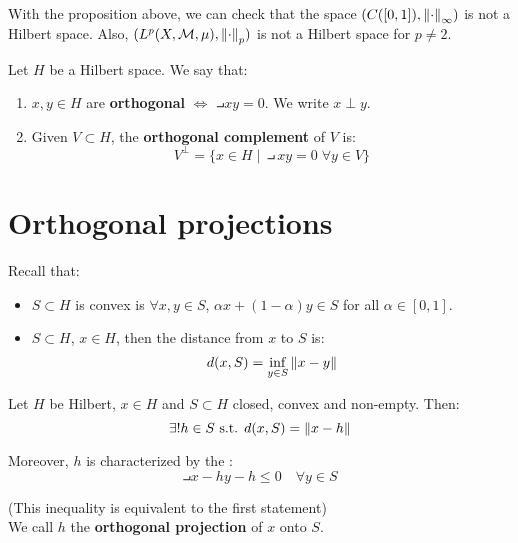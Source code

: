 \begin{fremark}
    With the proposition above, we can check that the space $(C([0, 1]), \left\|\cdot\right\|_\infty)$
    is not a Hilbert space. Also, $(L^p(X, \mathcal{M}, \mu), \left\|\cdot\right\|_p)$ is not a Hilbert space for $p \neq 2$.
\end{fremark}

\begin{fdefinition}
    Let $H$ be a Hilbert space. We say that:
    \vspace{1em}
    \begin{enumerate}[label=(\roman*)]
        \item $x, y \in H$ are \textbf{orthogonal} $\iff$ $\intprod{x}{y} = 0$. We write $x \perp y$.
        \vspace{1em}
        \item Given $V \subset H$, the \textbf{orthogonal complement} of $V$ is:
        $$V^\perp = \{x \in H \; | \; \intprod{x}{y} = 0 \; \forall y \in V\}$$
    \end{enumerate}
\end{fdefinition}

\section{Orthogonal projections}

\begin{note}
    Recall that:
    \begin{itemize}
        \item $S \subset H$ is convex is $\forall x, y \in S$, $\alpha x + (1 - \alpha) y \in S$ for all $\alpha \in [0, 1]$.
        \item $S \subset H$, $x \in H$, then the distance from $x$ to $S$ is:
        $$d(x, S) = \inf_{y \in S} \left\|x - y\right\|$$
    \end{itemize}
\end{note}

\begin{ftheorem}
    Let $H$ be Hilbert, $x \in H$ and $S \subset H$ closed, convex and non-empty. Then:\\
    $$\exists ! h \in S \text{ s.t. } d(x, S) = \left\|x - h\right\|$$
    
    Moreover, $h$ is characterized by the :
    $$\intprod{x - h}{y - h} \leq 0 \quad \forall y \in S$$

    (This inequality is equivalent to the first statement)\\

    We call $h$ the \textbf{orthogonal projection} of $x$ onto $S$.
\end{ftheorem}

